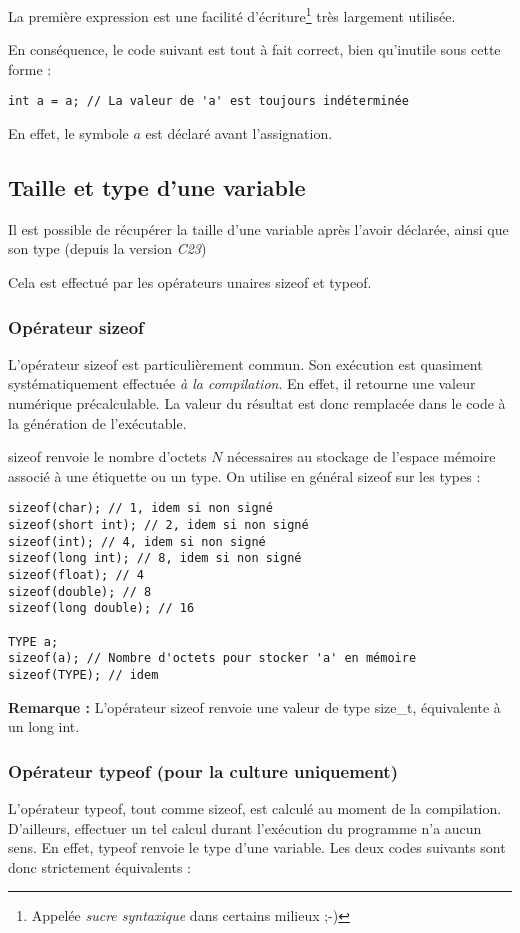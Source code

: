 \documentclass[../../../main.tex]{subfiles}
\begin{document}
La première expression est une facilité d'écriture\footnote{Appelée \textit{sucre syntaxique} dans certains milieux ;-)} très largement utilisée.
 
En conséquence, le code suivant est tout à fait correct, bien qu'inutile sous cette forme :
\begin{verbatim}
int a = a; // La valeur de 'a' est toujours indéterminée
\end{verbatim}
En effet, le symbole $a$ est déclaré avant l'assignation.
\subsection{Taille et type d'une variable}
\label{sub:taille_et_type_d_une_variable}
Il est possible de récupérer la taille d'une variable après l'avoir déclarée, ainsi que son type (depuis la version \textit{C23})
 
Cela est effectué par les opérateurs unaires \textsf{sizeof} et \textsf{typeof}.
 
\subsubsection{Opérateur \textsf{sizeof}}
 \label{ssub:op_rateur_textsf_sizeof}
L'opérateur \textsf{sizeof} est particulièrement commun. Son exécution est quasiment systématiquement effectuée \textit{à la compilation}. En effet, il retourne une valeur numérique précalculable. La valeur du résultat est donc remplacée dans le code à la génération de l'exécutable.
 
\textsf{sizeof} renvoie le nombre d'octets $N$ nécessaires au stockage de l'espace mémoire associé à une étiquette ou un type. On utilise en général \textsf{sizeof} sur les types :
\begin{verbatim}
sizeof(char); // 1, idem si non signé
sizeof(short int); // 2, idem si non signé
sizeof(int); // 4, idem si non signé
sizeof(long int); // 8, idem si non signé
sizeof(float); // 4
sizeof(double); // 8
sizeof(long double); // 16

TYPE a;
sizeof(a); // Nombre d'octets pour stocker 'a' en mémoire
sizeof(TYPE); // idem
\end{verbatim}
\textbf{Remarque :} L'opérateur \textsf{sizeof} renvoie une valeur de type \textsf{size\_t}, équivalente à un \textsf{long int}.

\subsubsection{Opérateur \textsf{typeof} (pour la culture uniquement)}
\label{ssub:op_rateur_textsf_typeof}
L'opérateur \textsf{typeof}, tout comme \textsf{sizeof}, est calculé au moment de la compilation. D'ailleurs, effectuer un tel calcul durant l'exécution du programme n'a aucun sens. En effet, \textsf{typeof} renvoie le type d'une variable. Les deux codes suivants sont donc strictement équivalents : 
\end{document}
